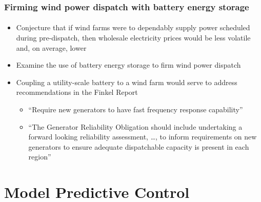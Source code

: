 \documentclass[presentation, smaller, table, svgnames]{beamer}
\begin{document}
\begin{frame}
	\frametitle{Firming wind power dispatch with battery energy storage}
	\framesubtitle{}

	\begin{itemize}
		\item  Conjecture that if wind farms were to dependably supply power scheduled during pre-dispatch, then wholesale electricity prices would be less volatile and, on average, lower
		
		\item  Examine the use of battery energy storage to firm wind power dispatch
		
		\item  Coupling a utility-scale battery to a wind farm would serve to address recommendations in the Finkel Report\footnotemark[3]
		\begin{itemize}
			\item  ``Require new generators to have fast frequency response capability''
			\item  ``The Generator Reliability Obligation should include undertaking a forward looking reliability assessment, \ldots, to inform requirements on new generators to ensure adequate dispatchable capacity is present in each region''
		\end{itemize}
		
	\end{itemize}
	
\footnotesize{
\par
}

\end{frame}

\section{Model Predictive Control}
\end{document}
